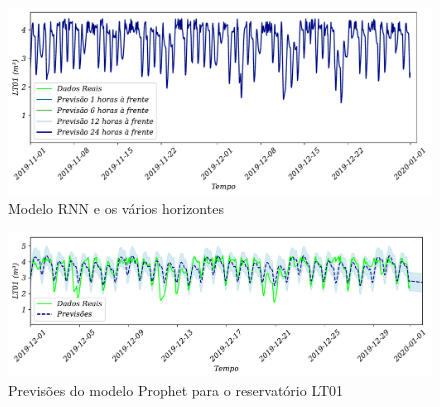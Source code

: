\begin{figure}[!htb]
	\centering
	\caption{Modelo RNN e os vários horizontes }
	\label{fig:rnn}
	\includegraphics[width=0.6\linewidth]{Resultados/Figuras/RNN}
\end{figure}
\begin{figure}[!htb]
	\centering
	\caption{Previsões do modelo Prophet para o reservatório LT01}\label{fig:prophet1}
	\includegraphics[width=0.7\linewidth]{Resultados/Figuras/prophet1}
	
	
\end{figure}



